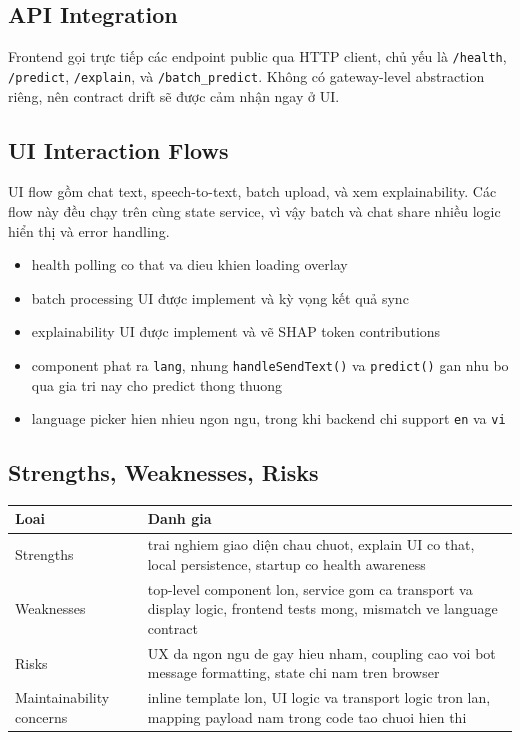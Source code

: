 \subsection{API Integration}
Frontend gọi trực tiếp các endpoint public qua HTTP client, chủ yếu là \texttt{/health}, \texttt{/predict}, \texttt{/explain}, và \texttt{/batch\_predict}. Không có gateway-level abstraction riêng, nên contract drift sẽ được cảm nhận ngay ở UI.

\subsection{UI Interaction Flows}
UI flow gồm chat text, speech-to-text, batch upload, và xem explainability. Các flow này đều chạy trên cùng state service, vì vậy batch và chat share nhiều logic hiển thị và error handling.

\begin{itemize}[leftmargin=1.2em]
  \item health polling co that va dieu khien loading overlay
  \item batch processing UI được implement và kỳ vọng kết quả sync
  \item explainability UI được implement và vẽ SHAP token contributions
  \item component phat ra \texttt{lang}, nhung \texttt{handleSendText()} va \texttt{predict()} gan nhu bo qua gia tri nay cho predict thong thuong
  \item language picker hien nhieu ngon ngu, trong khi backend chi support \texttt{en} va \texttt{vi}
\end{itemize}

\subsection{Strengths, Weaknesses, Risks}
\begin{table}[H]
\centering
\begin{tabularx}{\textwidth}{@{}lX@{}}
\toprule
\textbf{Loai} & \textbf{Danh gia} \\
\midrule
Strengths & trai nghiem giao diện chau chuot, explain UI co that, local persistence, startup co health awareness \\
Weaknesses & top-level component lon, service gom ca transport va display logic, frontend tests mong, mismatch ve language contract \\
Risks & UX da ngon ngu de gay hieu nham, coupling cao voi bot message formatting, state chi nam tren browser \\
Maintainability concerns & inline template lon, UI logic va transport logic tron lan, mapping payload nam trong code tao chuoi hien thi \\
\bottomrule
\end{tabularx}
\end{table}

